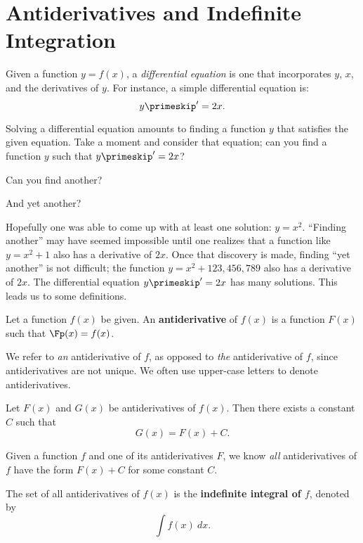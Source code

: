 \section{Antiderivatives and Indefinite Integration}\label{sec:antider}

Given a function $y=f(x)$, a \textit{differential equation} is one that incorporates $y$, $x$, and the derivatives of $y$. For instance, a simple differential equation is: $$y\primeskip' = 2x.$$

Solving a differential equation amounts to finding a function $y$ that satisfies the given equation. Take a moment and consider that equation; can you find a function $y$ such that $y\primeskip' = 2x$?

Can you find another?

And yet another?

Hopefully one was able to come up with at least one solution: $y = x^2$. ``Finding another'' may have seemed impossible until one realizes that a function like $y=x^2+1$ also has a derivative of $2x$. Once that discovery is made, finding ``yet another'' is not difficult; the function $y = x^2 + 123{,}456{,}789$ also has a derivative of $2x$. The differential equation $y\primeskip' = 2x$ has many solutions. This leads us to some definitions.

{Let a function $f(x)$ be given. An \textbf{antiderivative} of $f(x)$ is a function $F(x)$ such that $\Fp(x) = f(x)$.}

We refer to \textit{an} antiderivative of $f$, as opposed to \textit{the} antiderivative of $f$, since antiderivatives are not unique. We often use upper-case letters to denote antiderivatives.


{Let $F(x)$ and $G(x)$ be antiderivatives of $f(x)$. Then there exists a constant $C$ such that $$G(x) = F(x) + C.$$}

Given a function $f$ and one of its antiderivatives $F$, we know \textit{all} antiderivatives of $f$ have the form $F(x) + C$ for some constant $C$.

{The set of all antiderivatives of $f(x)$ is the \textbf{indefinite integral of $f$}, denoted by $$\int f(x) \ dx.$$}

